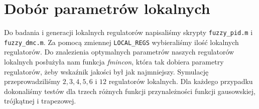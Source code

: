 \section{Dobór parametrów lokalnych}
Do badania i generacji lokalnych regulatorów napisaliśmy skrypty \verb|fuzzy_pid.m| i \verb|fuzzy_dmc.m|. Za pomocą zmiennej \verb|LOCAL_REGS| wybieraliśmy ilość lokalnych regulatorów. Do znalezienia optymalnych parametrów naszych regulatorów lokalnych posłużyła nam funkcja \textit{fmincon}, która tak dobiera parametry regulatorów, żeby wskaźnik jakości był jak najmniejszy. Symulację przeprowadziliśmy $2, 3, 4, 5, 6$ i $12$ regulatorów lokalnych. Dla każdego przypadku dokonaliśmy testów dla trzech różnych funkcji przynależności funkcji gausowskiej, trójkątnej i trapezowej. 